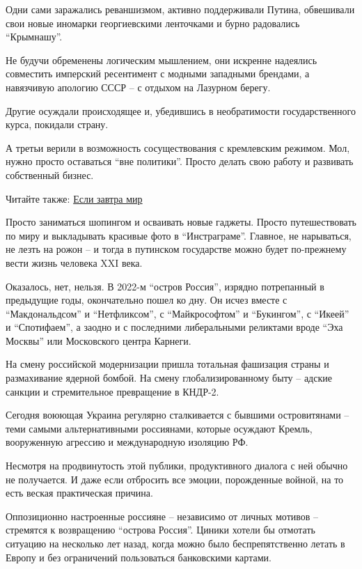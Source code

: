 Одни сами заражались реваншизмом, активно поддерживали Путина, обвешивали свои
новые иномарки георгиевскими ленточками и бурно радовались \enquote{Крымнашу}.

Не будучи обременены логическим мышлением, они искренне надеялись совместить
имперский ресентимент с модными западными брендами, а навязчивую апологию СССР
– с отдыхом на Лазурном берегу.

Другие осуждали происходящее и, убедившись в необратимости государственного
курса, покидали страну.

А третьи верили в возможность сосуществования с кремлевским режимом. Мол, нужно
просто оставаться \enquote{вне политики}. Просто делать свою работу и развивать
собственный бизнес.

\begin{qqnagolos}
Читайте также: \href{https://www.pravda.com.ua/rus/articles/2022/04/2/7336113/}{Если завтра мир}
\end{qqnagolos}

Просто заниматься шопингом и осваивать новые гаджеты. Просто путешествовать по
миру и выкладывать красивые фото в \enquote{Инстраграме}. Главное, не нарываться, не
лезть на рожон – и тогда в путинском государстве можно будет по-прежнему вести
жизнь человека XXI века.

Оказалось, нет, нельзя. В 2022-м \enquote{остров Россия}, изрядно потрепанный в
предыдущие годы, окончательно пошел ко дну. Он исчез вместе с \enquote{Макдональдсом} и
\enquote{Нетфликсом}, с \enquote{Майкрософтом} и \enquote{Букингом}, с \enquote{Икеей} и \enquote{Спотифаем}, а заодно
и с последними либеральными реликтами вроде \enquote{Эха Москвы} или Московского центра
Карнеги.

\begin{leftbar} 
На смену российской модернизации пришла тотальная фашизация
страны и размахивание ядерной бомбой. На смену глобализированному быту – адские
санкции и стремительное превращение в КНДР-2. 
\end{leftbar}

Сегодня воюющая Украина регулярно сталкивается с бывшими островитянами – теми
самыми альтернативными россиянами, которые осуждают Кремль, вооруженную
агрессию и международную изоляцию РФ.

Несмотря на продвинутость этой публики, продуктивного диалога с ней обычно не
получается. И даже если отбросить все эмоции, порожденные войной, на то есть
веская практическая причина.

Оппозиционно настроенные россияне – независимо от личных мотивов – стремятся к
возвращению \enquote{острова Россия}. Циники хотели бы отмотать ситуацию на несколько
лет назад, когда можно было беспрепятственно летать в Европу и без ограничений
пользоваться банковскими картами.

